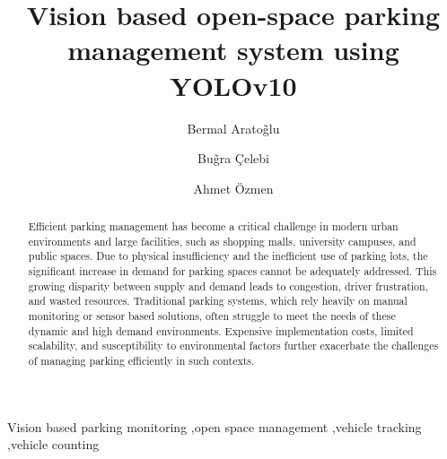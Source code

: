 \documentclass[5p,twocolumn,english]{elsarticle}
\begin{document}
%
\begin{frontmatter}

\title{Vision based open-space parking management system using YOLOv10}

\author[first]{Bermal Arato\~glu}%

\author[first]{Bu\~gra \c{C}elebi}%

\author[first]{Ahmet \"Ozmen}%


\address[first]{Department of Software Engineering, Sakarya University, Sakarya, 54050, TURKEY}%

\begin{abstract}
Efficient parking management has become a critical challenge in modern urban environments and large facilities, such as shopping malls, university campuses, and public spaces. Due to physical insufficiency and the inefficient use of parking lots, the significant increase in demand for parking spaces cannot be adequately addressed. This growing disparity between supply and demand leads to congestion, driver frustration, and wasted resources. Traditional parking systems, which rely heavily on manual monitoring or sensor based solutions, often struggle to meet the needs of these dynamic and high demand environments. Expensive implementation costs, limited scalability, and susceptibility to environmental factors further exacerbate the challenges of managing parking efficiently in such contexts.
\end{abstract}

\begin{keyword}
  Vision based parking monitoring \sep open space management \sep vehicle tracking \sep vehicle counting
\end{keyword}


\end{frontmatter}


\end{document}
